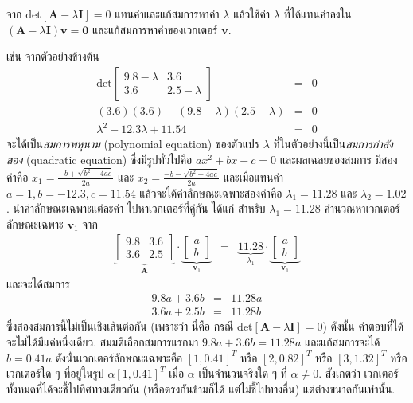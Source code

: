 จาก $\mathrm{det} [\bm{A} - \lambda \bm{I}] = 0$
แทนค่าและแก้สมการหาค่า $\lambda$
แล้วใช้ค่า $\lambda$ ที่ได้แทนค่าลงใน $(\bm{A} - \lambda \bm{I}) \bm{v} = \bm{0}$ และแก้สมการหาค่าของเวกเตอร์ $\bm{v}$.

เช่น จากตัวอย่างข้างต้น
\begin{eqnarray}
\mathrm{det} 
\begin{bmatrix}
9.8 - \lambda & 3.6 \\
3.6 & 2.5 - \lambda
\end{bmatrix}
&=& 0
\nonumber \\
(3.6)(3.6) - (9.8 - \lambda)(2.5 - \lambda) 
&=& 0
\nonumber \\
\lambda^2 - 12.3 \lambda + 11.54 &=& 0
\nonumber
\end{eqnarray}
จะได้เป็น\textit{สมการพหุนาม} (polynomial equation) ของตัวแปร $\lambda$
ที่ในตัวอย่างนี้เป็น\textit{สมการกำลังสอง}
(quadratic equation)
ซึ่งมีรูปทั่วไปคือ $a x^2 + b x + c = 0$ และผลเฉลยของสมการ มีสองค่าคือ $x_1 = \frac{-b+\sqrt{b^2 - 4 a c}}{2 a}$ และ
$x_2 = \frac{-b-\sqrt{b^2 - 4 a c}}{2 a}$
และเมื่อแทนค่า $a = 1, b = -12.3, c = 11.54$ แล้วจะได้ค่าลักษณะเฉพาะสองค่าคือ
$\lambda_1 = 11.28$
และ
$\lambda_2 = 1.02$.
นำค่าลักษณะเฉพาะแต่ละค่า ไปหาเวกเตอร์ที่คู่กัน ได้แก่
สำหรับ $\lambda_1 = 11.28$ คำนวณหาเวกเตอร์ลักษณะเฉพาะ $\bm{v}_1$ จาก
\begin{eqnarray}
\underbrace{\begin{bmatrix}
	9.8 & 3.6 \\
	3.6 & 2.5
	\end{bmatrix}}_{\bm{A}}
\cdot
\underbrace{\begin{bmatrix}
	a \\
	b
	\end{bmatrix}}_{\bm{v}_1}
&=&
\underbrace{11.28}_{\lambda_1}
\cdot
\underbrace{\begin{bmatrix}
	a \\
	b
	\end{bmatrix}}_{\bm{v}_1}
\nonumber
\end{eqnarray}
และจะได้สมการ
\begin{eqnarray}
9.8 a + 3.6 b &=& 11.28 a
\nonumber \\
3.6 a + 2.5 b &=& 11.28 b
\nonumber
\end{eqnarray}
ซึ่งสองสมการนี้ไม่เป็นเชิงเส้นต่อกัน (เพราะว่า นี่คือ กรณี $\mathrm{det} [\bm{A} - \lambda \bm{I}] = 0$)
ดังนั้น คำตอบที่ได้จะไม่ได้มีแค่หนึ่งเดียว.
สมมติเลือกสมการแรกมา
$9.8 a + 3.6 b = 11.28 a$
และแก้สมการจะได้ $b = 0.41 a$
ดังนั้นเวกเตอร์ลักษณะเฉพาะคือ
$[1, 0.41]^T$ 
หรือ
$[2, 0.82]^T$
หรือ
$[3, 1.32]^T$
หรือ เวกเตอร์ใด ๆ  ที่อยู่ในรูป $\alpha [1, 0.41]^T$ เมื่อ $\alpha$ เป็นจำนวนจริงใด ๆ ที่ $\alpha \neq 0$.
สังเกตว่า เวกเตอร์ทั้งหมดที่ได้จะชี้ไปทิศทางเดียวกัน (หรือตรงกันข้ามก็ได้ แต่ไม่ชี้ไปทางอื่น)
แต่ต่างขนาดกันเท่านั้น.

